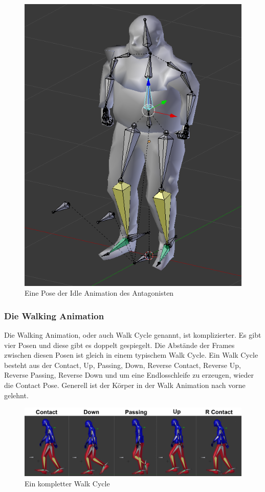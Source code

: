 \begin{figure}[H]
    \centering

    \includegraphics[width=.8\textwidth]{images/animation_an_idle.PNG}
    \caption{Eine Pose der Idle Animation des Antagonisten}
\end{figure}

\subsubsection{Die Walking Animation}
Die Walking Animation, oder auch Walk Cycle genannt, ist komplizierter. Es gibt vier Posen und diese gibt es doppelt gespiegelt.
Die Abstände der Frames zwischen diesen Posen ist gleich in einem typischem Walk Cycle. Ein Walk Cycle besteht aus der Contact,
Up, Passing, Down, Reverse Contact, Reverse Up, Reverse Passing,
Reverse Down und um eine Endlosschleife zu erzeugen, wieder die Contact Pose. Generell ist der Körper in der Walk Animation nach vorne gelehnt.

\begin{figure}[H]
    \centering

    \includegraphics[width=.8\textwidth]{images/animation_walk_cycle.png}
    \caption{Ein kompletter Walk Cycle}
\end{figure}

